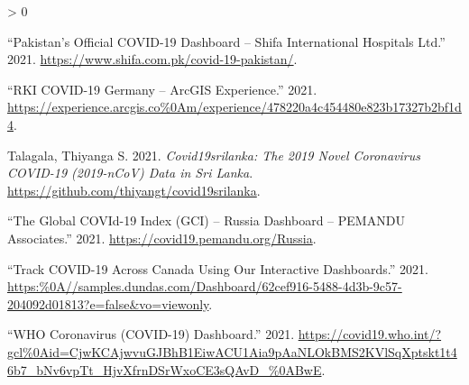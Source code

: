\documentclass[
]{article}
\newlength{\cslhangindent}
\newenvironment{CSLReferences}[2] %
 {%
  \setlength{\parindent}{0pt}
  \ifodd #1 \everypar{\setlength{\hangindent}{\cslhangindent}}\ignorespaces\fi
  \ifnum #2 > 0
  \setlength{\parskip}{#2\baselineskip}
  \fi
 }%
 {}
\begin{document}
\begin{CSLReferences}{1}{0}
\leavevmode\hypertarget{ref-pakistan}{}%
{``{Pakistan's Official COVID-19 Dashboard -- Shifa International
Hospitals Ltd}.''} 2021.
\url{https://www.shifa.com.pk/covid-19-pakistan/}.

\leavevmode\hypertarget{ref-rki}{}%
{``{RKI COVID-19 Germany -- ArcGIS Experience}.''} 2021.
\url{https://experience.arcgis.co\%0Am/experience/478220a4c454480e823b17327b2bf1d4}.

\leavevmode\hypertarget{ref-talagala}{}%
Talagala, Thiyanga S. 2021. \emph{Covid19srilanka: The 2019 Novel
Coronavirus COVID-19 (2019-nCoV) Data in Sri Lanka}.
\url{https://github.com/thiyangt/covid19srilanka}.

\leavevmode\hypertarget{ref-russia}{}%
{``{The Global COVId-19 Index (GCI) -- Russia Dashboard -- PEMANDU
Associates}.''} 2021. \url{https://covid19.pemandu.org/Russia}.

\leavevmode\hypertarget{ref-canada}{}%
{``{Track COVID-19 Across Canada Using Our Interactive Dashboards}.''}
2021.
\url{https:\%0A//samples.dundas.com/Dashboard/62cef916-5488-4d3b-9c57-204092d01813?e=false\&vo=viewonly}.

\leavevmode\hypertarget{ref-who}{}%
{``{WHO Coronavirus (COVID-19) Dashboard}.''} 2021.
\url{https://covid19.who.int/?gcl\%0Aid=CjwKCAjwvuGJBhB1EiwACU1Aia9pAaNLOkBMS2KVlSqXptskt1t46b7_bNv6vpTt_HjvXfrnDSrWxoCE3sQAvD_\%0ABwE}.

\end{CSLReferences}
\end{document}
